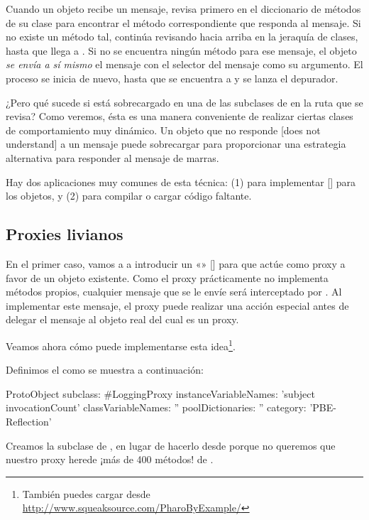 \documentclass[a4paper,10pt,twoside]{book}
\begin{document}
Cuando un objeto recibe un mensaje, revisa primero en el diccionario
de m\'etodos de su clase para encontrar el m\'etodo correspondiente que
responda al mensaje.  Si no existe un m\'etodo tal, contin\'ua revisando
hacia arriba en la jeraqu\'ia de clases, hasta que llega a .
Si no se encuentra ning\'un m\'etodo para ese mensaje, el objeto \emph{se
  env\'ia a s\'i mismo} el mensaje  con el selector
del mensaje como su argumento.  El proceso se inicia de nuevo, hasta
que se encuentra a  y se lanza
el depurador.

¿Pero qu\'e sucede si  est\'a sobrecargado en una
de las subclases de  en la ruta que se revisa?  Como
veremos, \'esta es una manera conveniente de realizar ciertas clases de
comportamiento muy din\'amico.  Un objeto que no responde [does not
understand] a un mensaje puede sobrecargar 
para proporcionar una estrategia alternativa para responder al mensaje
de marras.

Hay dos aplicaciones muy comunes de esta t\'ecnica: (1) para implementar
 [] para los objetos, y
(2) para compilar o cargar c\'odigo faltante.

\subsection{Proxies livianos}

En el primer caso, vamos a a introducir un «»
[] para que act\'ue como proxy a favor de un objeto
existente.  Como el proxy pr\'acticamente no implementa m\'etodos propios,
cualquier mensaje que se le env\'ie ser\'a interceptado por
.  Al implementar este mensaje, el proxy puede
realizar una acci\'on especial antes de delegar el mensaje al objeto
real del cual es un proxy.

Veamos ahora c\'omo puede implementarse esta idea\footnote{Tambi\'en
  puedes cargar  desde
  \url{http://www.squeaksource.com/PharoByExample/}}.

Definimos el  como se muestra a continuaci\'on:
\begin{code}{}
ProtoObject subclass: #LoggingProxy
        instanceVariableNames: 'subject invocationCount'
        classVariableNames: ''
        poolDictionaries: ''
        category: 'PBE-Reflection'
\end{code}
Creamos la subclase de , en lugar de hacerlo desde
 porque no queremos que nuestro proxy herede ¡m\'as de 400
m\'etodos! de .
\end{document}
